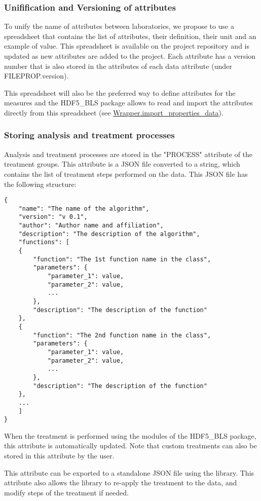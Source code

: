 \subsubsection*{Unifification and Versioning of attributes}
    To unify the name of attributes between laboratories, we propose to use a spreadsheet that contains the list of attributes, their definition, their unit and an example of value. This spreadsheet is available on the project repository and is updated as new attributes are added to the project. Each attribute has a version number that is also stored in the attributes of each data attribute (under FILEPROP.version).

    This spreadsheet will also be the preferred way to define attributes for the measures and the HDF5\_BLS package allows to read and import the attributes directly from this spreadsheet (see \hyperref[subchapter:wrapper.import_properties_data]{Wrapper.import\_properties\_data}).
    
\subsubsection*{Storing analysis and treatment processes}

    Analysis and treatment processes are stored in the "PROCESS" attribute of the treatment groups. This attribute is a JSON file converted to a string, which contains the list of treatment steps performed on the data. This JSON file has the following structure:
    \begin{verbatim}
{
    "name": "The name of the algorithm",
    "version": "v 0.1",
    "author": "Author name and affiliation",
    "description": "The description of the algorithm",
    "functions": [
    {
        "function": "The 1st function name in the class",
        "parameters": {
            "parameter_1": value,
            "parameter_2": value,
            ...
        },
        "description": "The description of the function"
    },
    {
        "function": "The 2nd function name in the class",
        "parameters": {
            "parameter_1": value,
            "parameter_2": value,
            ...
        },
        "description": "The description of the function"
    },
    ...
    ]
}
    \end{verbatim}

    When the treatment is performed using the modules of the HDF5\_BLS package, this attribute is automatically updated. Note that custom treatments can also be stored in this attribute by the user.

    This attribute can be exported to a standalone JSON file using the library. This attribute also allows the library to re-apply the treatment to the data, and modify steps of the treatment if needed.
    